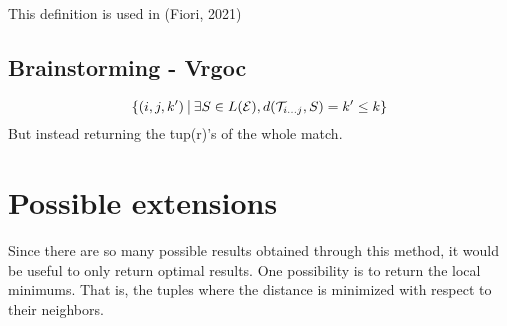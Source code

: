 \documentclass{article}
\newcommand{\set}[1]{\left\{#1\right\}}
\newcommand{\st}{\ \vline \ }
\begin{document}
This definition is used in (Fiori, 2021)

\subsection{Brainstorming - Vrgoc}
\begin{equation*}
    \set{(i, j, k') \st \exists S \in L(\mathcal{E}), d(\mathcal{T}_{i...j},S) = k' \leq k}
\end{equation*}
But instead returning the tup(r)'s of the whole match.

\section{Possible extensions}

Since there are so many possible results obtained through this method, it would be useful to only return optimal results. One possibility is to return the local minimums. That is, the tuples where the distance is minimized with respect to their neighbors.
\end{document}
